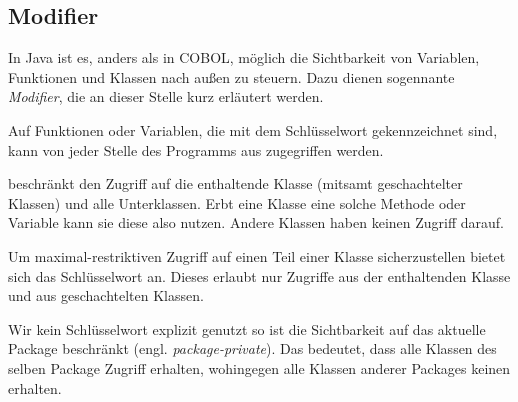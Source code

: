 \subsection{Modifier}
In Java ist es, anders als in COBOL, möglich die Sichtbarkeit von Variablen, Funktionen und Klassen nach außen zu steuern. Dazu dienen sogennante \textit{Modifier}, die an dieser Stelle kurz erläutert werden.

Auf Funktionen oder Variablen, die mit dem Schlüsselwort  gekennzeichnet sind, kann von jeder Stelle des Programms aus zugegriffen werden.

 beschränkt den Zugriff auf die enthaltende Klasse (mitsamt geschachtelter Klassen) und alle Unterklassen. Erbt eine Klasse eine solche Methode oder Variable kann sie diese also nutzen. Andere Klassen haben keinen Zugriff darauf.

Um maximal-restriktiven Zugriff auf einen Teil einer Klasse sicherzustellen bietet sich das Schlüsselwort  an. Dieses erlaubt nur Zugriffe aus der enthaltenden Klasse und aus geschachtelten Klassen.

Wir kein Schlüsselwort explizit genutzt so ist die Sichtbarkeit auf das aktuelle Package beschränkt (engl. \textit{package-private}). Das bedeutet, dass alle Klassen des selben Package Zugriff erhalten, wohingegen alle Klassen anderer Packages keinen erhalten.
